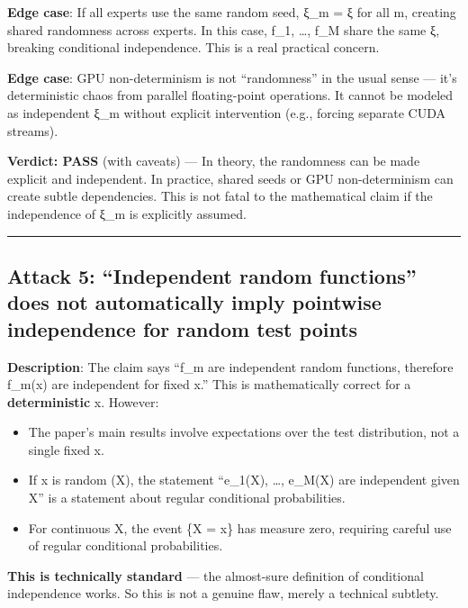 \documentclass[
  12pt,
]{ctexart}
\providecommand{\tightlist}{%
  \setlength{\itemsep}{0pt}\setlength{\parskip}{0pt}}
\begin{document}
\textbf{Edge case}: If all experts use the same random seed, ξ\_m = ξ
for all m, creating shared randomness across experts. In this case,
f\_1, \ldots, f\_M share the same ξ, breaking conditional independence.
This is a real practical concern.

\textbf{Edge case}: GPU non-determinism is not ``randomness'' in the
usual sense --- it's deterministic chaos from parallel floating-point
operations. It cannot be modeled as independent ξ\_m without explicit
intervention (e.g., forcing separate CUDA streams).

\textbf{Verdict: PASS} (with caveats) --- In theory, the randomness can
be made explicit and independent. In practice, shared seeds or GPU
non-determinism can create subtle dependencies. This is not fatal to the
mathematical claim if the independence of ξ\_m is explicitly assumed.

\begin{center}\rule{0.5\linewidth}{0.5pt}\end{center}

\subsection{Attack 5: ``Independent random functions'' does not
automatically imply pointwise independence for random test
points}\label{attack-5-independent-random-functions-does-not-automatically-imply-pointwise-independence-for-random-test-points}

\textbf{Description}: The claim says ``f\_m are independent random
functions, therefore f\_m(x) are independent for fixed x.'' This is
mathematically correct for a \textbf{deterministic} x. However:

\begin{itemize}
\tightlist
\item
  The paper's main results involve expectations over the test
  distribution, not a single fixed x.
\item
  If x is random (X), the statement ``e\_1(X), \ldots, e\_M(X) are
  independent given X'' is a statement about regular conditional
  probabilities.
\item
  For continuous X, the event \{X = x\} has measure zero, requiring
  careful use of regular conditional probabilities.
\end{itemize}

\textbf{This is technically standard} --- the almost-sure definition of
conditional independence works. So this is not a genuine flaw, merely a
technical subtlety.
\end{document}
